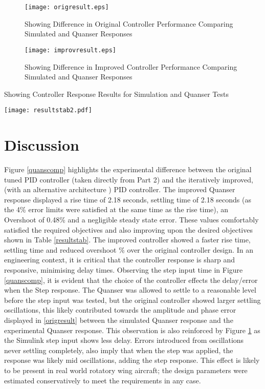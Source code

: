 \begin{figure}[H]
\centering
\begin{minipage}{.49\textwidth}
\centering
\texttt{[image: origresult.eps]}
\caption{Showing Difference in Original Controller Performance Comparing Simulated and Quanser Responses}
\label{origresult}
\end{minipage}
\hfill
\begin{minipage}{.49\textwidth}
\centering
\texttt{[image: improvresult.eps]}
\caption{Showing Difference in Improved Controller Performance Comparing Simulated and Quanser Responses}
\label{improvresult}
\end{minipage}
\vspace{-20pt}
\end{figure}

\begin{table}[H]
 \centering
 \caption{Showing Controller Response Results for Simulation and Quanser Tests}
 \texttt{[image: resultstab2.pdf]}
 \label{resultstab}
 \end{table}

\section{Discussion}\label{discussion}

Figure \ref{quanscomp} highlights the experimental difference between
the original tuned PID controller (taken directly from Part 2) and the
iteratively improved, (with an alternative architecture ) PID
controller. The improved Quanser response displayed a rise time of 2.18
seconds, settling time of 2.18 seconds (as the 4\% error limits were
satisfied at the same time as the rise time), an Overshoot of 0.48\% and
a negligible steady state error. These values comfortably satisfied the
required objectives and also improving upon the desired objectives shown
in Table \ref{resultstab}. The improved controller showed a faster rise
time, settling time and reduced overshoot \% over the original
controller design. In an engineering context, it is critical that the
controller response is sharp and responsive, minimising delay times.
Observing the step input time in Figure \ref{quanscomp}, it is evident
that the choice of the controller effects the delay/error when the Step
response. The Quanser was allowed to settle to a reasonable level before
the step input was tested, but the original controller showed larger
settling oscillations, this likely contributed towards the amplitude and
phase error displayed in \ref{origresult} between the simulated Quanser
response and the experimental Quanser response. This observation is also
reinforced by Figure \ref{improvresult} as the Simulink step input shows
less delay. Errors introduced from oscillations never settling
completely, also imply that when the step was applied, the response was
likely mid oscillations, adding the step response. This effect is likely
to be present in real world rotatory wing aircraft; the design
parameters were estimated conservatively to meet the requirements in any
case.

